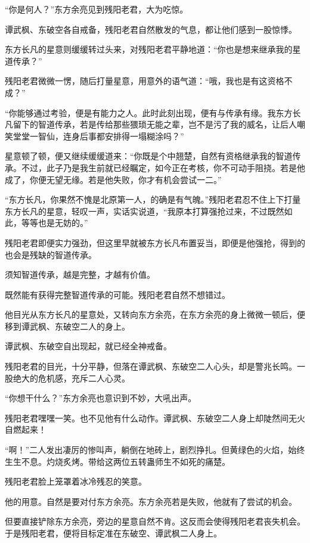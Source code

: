 
\begin{this_body}

“你是何人？”东方余亮见到残阳老君，大为吃惊。

谭武枫、东破空各自戒备，残阳老君自然散发的气息，都让他们感到一股惊悸。

东方长凡的星意则缓缓转过头来，对残阳老君平静地道：“你也是想来继承我的星道传承？”

残阳老君微微一愣，随后打量星意，用意外的语气道：“哦，我也是有这资格不成？”

“你能够通过考验，便是有能力之人。此时此刻出现，便有与传承有缘。我东方长凡留下的智道传承，若是传给那些猥琐无能之辈，岂不是污了我的威名，让后人嘲笑堂堂一智仙，连身后事都安排得一塌糊涂吗？”

星意顿了顿，便又继续缓缓道来：“你既是个中翘楚，自然有资格继承我的智道传承。不过，此子乃是我生前就已经瞩定，如今正在考核，你不可动手阻挠。若是他成了，你便无望无缘。若是他失败，你才有机会尝试一二。”

“东方长凡，你果然不愧是北原第一人，的确是有气魄。”残阳老君忍不住上下打量东方长凡的星意，轻叹一声，实话实说道，“我原本打算强抢过来，不过既然如此，等等也是无妨的。”

残阳老君即便实力强劲，但这里早就被东方长凡布置妥当，即便是他强抢，得到的也会是残缺的智道传承。

须知智道传承，越是完整，才越有价值。

既然能有获得完整智道传承的可能。残阳老君自然不想错过。

他目光从东方长凡的星意处，又转向东方余亮，在东方余亮的身上微微一顿后，便移到谭武枫、东破空二人的身上。

谭武枫、东破空自出现起，就已经全神戒备。

残阳老君的目光，十分平静，但落在谭武枫、东破空二人心头，却是警兆长鸣。一股绝大的危机感，充斥二人心灵。

“你想干什么？”东方余亮也意识到不妙，大吼出声。

残阳老君嘿嘿一笑。也不见他有什么动作。谭武枫、东破空二人身上却陡然间无火自燃起来！

“啊！”二人发出凄厉的惨叫声，躺倒在地砖上，剧烈挣扎。但黄绿色的火焰，始终生生不息。灼烧炙烤。带给这两位五转蛊师生不如死的痛楚。

残阳老君脸上笼罩着冰冷残忍的笑意。

他的用意。自然是要对付东方余亮。东方余亮若是失败，他就有了尝试的机会。

但要直接铲除东方余亮，旁边的星意自然不肯。这反而会使得残阳老君丧失机会。于是残阳老君，便将目标定准在东破空、谭武枫二人身上。


\end{this_body}
